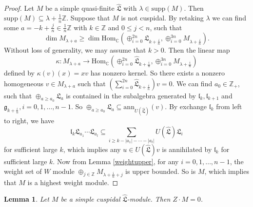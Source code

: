 \documentclass[1p]{elsarticle}
\numberwithin{equation}{section}
\def\fg{\mathfrak{g}}
\def\fL{\mathfrak{L}}
\def\bC{\mathbb{C}}
\def\bZ{\mathbb{Z}}
\def\supp{\mathrm{supp}}
\def\ann{\mathrm{ann}}
\def\Hom{\mathrm{Hom}}
\def\fl{\mathfrak{l}}
\def\hL{\hat{\fL}}
\newtheorem{lemm}[theo]{Lemma}
\begin{document}
\begin{proof}Let $M$ be a simple quasi-finite $\hat{\fL}$  with $\lambda\in \supp(M)$. Then $\supp(M)\subseteq \lambda +\frac 1n \bZ$. Suppose that $M$ is  not cuspidal. By retaking $\lambda$ we can find   some $a=-k+\frac jn\in \frac 1n\bZ$ with $k\in \bZ$ and $0\le j<n$, such that $$\dim M_{\lambda+a}\ge \dim \Hom_{\bC}(\oplus_{i=0}^{2n} \hL_{k+\frac in},\oplus_{i=0}^{3n}  M_{\lambda+\frac in}).$$ Without loss of generality, we may assume that $k>0$. Then the linear map $$\kappa:  M_{\lambda+a}\rightarrow \Hom_{\bC}(\oplus_{i=0}^{2n} \hL_{k+\frac in},\oplus_{i=0}^{3n}  M_{\lambda+\frac in})$$ defined by $ \kappa(v)(x)=xv$ has nonzero kernel. So there exists a nonzero homogeneous $v\in M_{\lambda+a}$ such that $(\sum_{i=0}^{2n} \hL_{k+\frac in}) v=0$. We can find $a_0\in \bZ_+$, such that $\oplus_{ a\ge a_0}\fL_{a}$ is contained in the subalgebra generated by $\fl_{k},\fl_{k+1}$ and $\fg_{k+\frac in},i=0,1,\ldots, n-1$. So $\oplus_{ a\ge a_0}\fL_{a}\subseteq \ann_{U(\hL)}(v)$. By exchange $\fl_{k}$ from left  to right, we have $$\fl_{k}\fL_{a_1}\cdots \fL_{a_l}\subseteq \sum_{i\ge k-|a_1|-\cdots-|a_l|} U(\hL)\fL_{i}$$ for sufficient large $k$, which implies any $u\in U(\hL) v$ is annihilated by $\fl_k$ for  sufficient large $k$. Now from Lemma \ref{weightupper}, for any $i=0,1,\ldots,n-1$, the weight set of $W$ module $\oplus_{j\in \bZ}M_{\lambda+\frac{i}n+j}$ is upper bounded. So is $M$, which implies that $M$ is a highest weight module.\end{proof}


\begin{lemm}\label{Z=0}Let $M$ be a  simple cuspidal $\hL$-module. Then $Z\cdot M=0$.\end{lemm}
\end{document}

